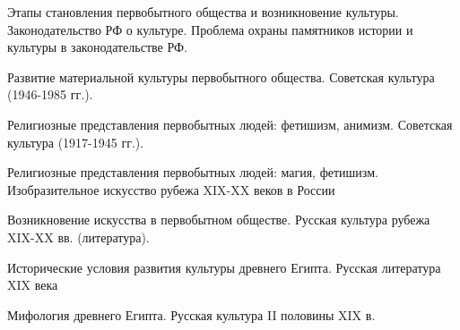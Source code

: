 


\shapkFull
\setcounter{zad}{0}

\z Этапы становления первобытного общества и возникновение культуры.
 \medskip
\z Законодательство РФ о культуре. Проблема охраны памятников истории и культуры в законодательстве РФ. \medskip

\newpage


\shapkFull
\setcounter{zad}{0}

\z Развитие материальной культуры первобытного общества.
 \medskip
\z Советская культура (1946-1985 гг.).
 \medskip

\newpage


\shapkFull
\setcounter{zad}{0}

\z Религиозные представления первобытных людей: фетишизм, анимизм.
 \medskip
\z Советская культура (1917-1945 гг.).
 \medskip

\newpage


\shapkFull
\setcounter{zad}{0}

\z Религиозные представления первобытных людей: магия, фетишизм.
 \medskip
\z Изобразительное искусство рубежа XIX-XX веков в России
 \medskip

\newpage


\shapkFull
\setcounter{zad}{0}

\z Возникновение искусства в первобытном обществе.
 \medskip
\z Русская культура рубежа XIX-XX вв. (литература).
 \medskip

\newpage


\shapkFull
\setcounter{zad}{0}

\z Исторические условия развития культуры древнего Египта.
 \medskip
\z Русская литература XIX века
 \medskip

\newpage


\shapkFull
\setcounter{zad}{0}

\z Мифология древнего Египта.
 \medskip
\z Русская культура II половины XIX в.
 \medskip

\newpage


\shapkFull
\setcounter{zad}{0}

